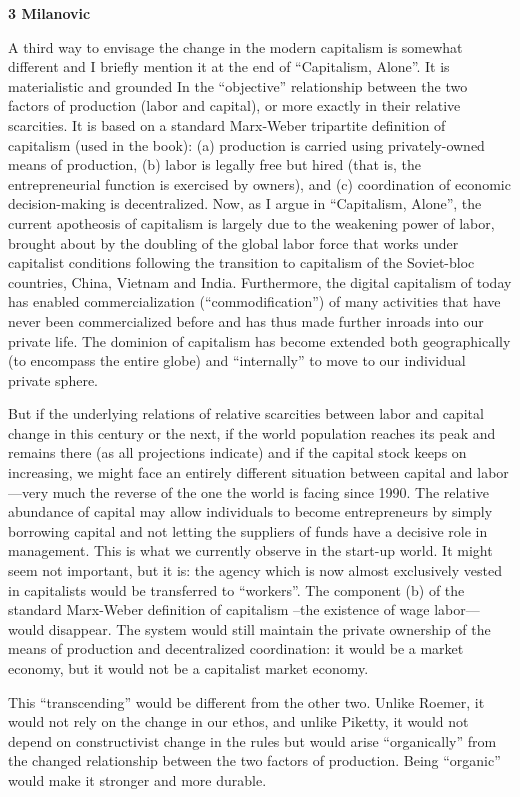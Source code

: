 \documentclass[
]{book}
\begin{document}
\textbf{3 Milanovic}

A third way to envisage the change in the modern capitalism is somewhat different and I briefly mention it at the end of ``Capitalism, Alone''. It is materialistic and grounded In the ``objective'' relationship between the two factors of production (labor and capital), or more exactly in their relative scarcities. It is based on a standard Marx-Weber tripartite definition of capitalism (used in the book): (a) production is carried using privately-owned means of production, (b) labor is legally free but hired (that is, the entrepreneurial function is exercised by owners), and (c) coordination of economic decision-making is decentralized. Now, as I argue in ``Capitalism, Alone'', the current apotheosis of capitalism is largely due to the weakening power of labor, brought about by the doubling of the global labor force that works under capitalist conditions following the transition to capitalism of the Soviet-bloc countries, China, Vietnam and India. Furthermore, the digital capitalism of today has enabled commercialization (``commodification'') of many activities that have never been commercialized before and has thus made further inroads into our private life. The dominion of capitalism has become extended both geographically (to encompass the entire globe) and ``internally'' to move to our individual private sphere.

But if the underlying relations of relative scarcities between labor and capital change in this century or the next, if the world population reaches its peak and remains there (as all projections indicate) and if the capital stock keeps on increasing, we might face an entirely different situation between capital and labor---very much the reverse of the one the world is facing since 1990. The relative abundance of capital may allow individuals to become entrepreneurs by simply borrowing capital and not letting the suppliers of funds have a decisive role in management. This is what we currently observe in the start-up world. It might seem not important, but it is: the agency which is now almost exclusively vested in capitalists would be transferred to ``workers''. The component (b) of the standard Marx-Weber definition of capitalism --the existence of wage labor---would disappear. The system would still maintain the private ownership of the means of production and decentralized coordination: it would be a market economy, but it would not be a capitalist market economy.

This ``transcending'' would be different from the other two. Unlike Roemer, it would not rely on the change in our ethos, and unlike Piketty, it would not depend on constructivist change in the rules but would arise ``organically'' from the changed relationship between the two factors of production. Being ``organic'' would make it stronger and more durable.
\end{document}
